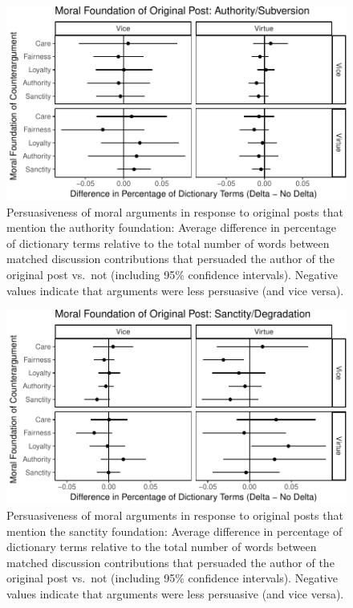 \documentclass[12pt,]{article}
\begin{document}
\begin{figure}
\centering
\includegraphics{prelim_files/figure-latex/op authority-1.pdf}
\caption{Persuasiveness of moral arguments in response to original posts
that mention the authority foundation: Average difference in percentage
of dictionary terms relative to the total number of words between
matched discussion contributions that persuaded the author of the
original post vs.~not (including 95\% confidence intervals). Negative
values indicate that arguments were less persuasive (and vice versa).}
\end{figure}

\begin{figure}
\centering
\includegraphics{prelim_files/figure-latex/op purity-1.pdf}
\caption{Persuasiveness of moral arguments in response to original posts
that mention the sanctity foundation: Average difference in percentage
of dictionary terms relative to the total number of words between
matched discussion contributions that persuaded the author of the
original post vs.~not (including 95\% confidence intervals). Negative
values indicate that arguments were less persuasive (and vice versa).}
\end{figure}
\end{document}
